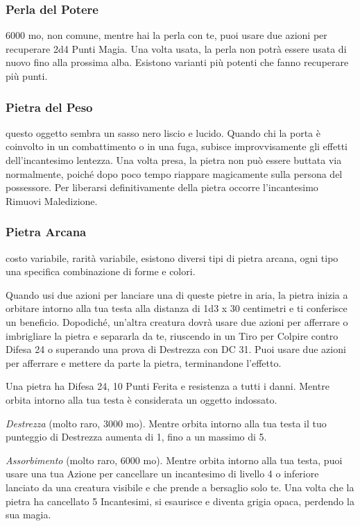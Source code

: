 \begin{multicols}{2}
	\subsubsection*{Perla del Potere}
	6000 mo, non comune, mentre hai la perla con te, puoi usare due azioni per recuperare 2d4 Punti Magia. Una volta usata, la perla non potrà essere usata di nuovo fino alla prossima alba. Esistono varianti più potenti che fanno recuperare più punti.

	\subsubsection*{Pietra del Peso}
	questo oggetto sembra un sasso nero liscio e lucido. Quando chi la porta è coinvolto in un combattimento o in una fuga, subisce improvvisamente gli effetti dell’incantesimo lentezza. Una volta presa, la pietra non può essere buttata via normalmente, poiché dopo poco tempo riappare magicamente sulla persona del possessore. Per liberarsi definitivamente della pietra occorre l'incantesimo Rimuovi Maledizione.

	\subsubsection*{Pietra Arcana}
	costo variabile, rarità variabile, esistono diversi tipi di pietra arcana, ogni tipo una specifica combinazione di forme e colori.

	Quando usi due azioni per lanciare una di queste pietre in aria, la pietra inizia a orbitare intorno alla tua testa alla distanza di 1d3 x 30 centimetri e ti conferisce un beneficio.
	Dopodiché, un'altra creatura dovrà usare due azioni per afferrare o imbrigliare la pietra e separarla da te, riuscendo in un Tiro per Colpire contro Difesa 24 o superando una prova di Destrezza con DC 31. Puoi usare due azioni per afferrare e mettere da parte la pietra, terminandone l'effetto.

	Una pietra ha Difesa 24, 10 Punti Ferita e resistenza a tutti i danni. Mentre orbita intorno alla tua testa è considerata un oggetto indossato.

	\textit{Destrezza} (molto raro, 3000 mo). Mentre orbita intorno alla tua testa il tuo punteggio di Destrezza aumenta di 1, fino a un massimo di 5.

	\textit{Assorbimento} (molto raro, 6000 mo). Mentre orbita intorno alla tua testa, puoi usare una tua Azione per cancellare un incantesimo di livello 4 o inferiore lanciato da una creatura visibile e che prende a bersaglio solo te. Una volta che la pietra ha cancellato 5 Incantesimi, si esaurisce e diventa grigia opaca, perdendo la sua magia.


\end{multicols}
